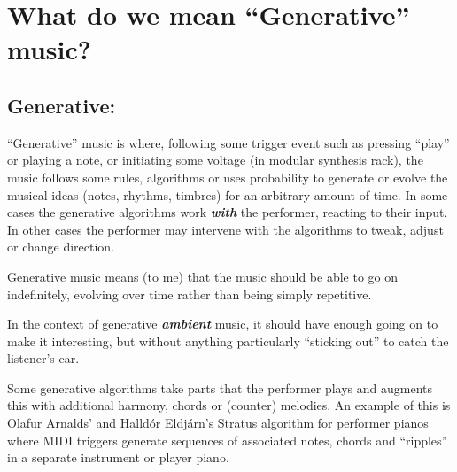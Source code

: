 \documentclass[
  12pt,
  letterpaper,
  oneside,
  open=any]{scrbook}
\begin{document}

\chapter{What do we mean ``Generative''
music?}\label{0000-Defintion-Generative}

\section*{Generative:}\label{generative}


``Generative'' music is where, following some trigger event such as
pressing ``play'' or playing a note, or initiating some voltage (in
modular synthesis rack), the music follows some rules, algorithms or
uses probability to generate or evolve the musical ideas (notes,
rhythms, timbres) for an arbitrary amount of time. In some cases the
generative algorithms work \textbf{\emph{with}} the performer, reacting
to their input. In other cases the performer may intervene with the
algorithms to tweak, adjust or change direction.

\begin{tcolorbox}[enhanced jigsaw, opacitybacktitle=0.6, rightrule=.15mm, leftrule=.75mm, opacityback=0, toptitle=1mm, toprule=.15mm, breakable, titlerule=0mm, colback=white, bottomtitle=1mm, title=\textcolor{quarto-callout-tip-color}{\faLightbulb}\hspace{0.5em}{Key idea}, coltitle=black, left=2mm, colframe=quarto-callout-tip-color-frame, bottomrule=.15mm, colbacktitle=quarto-callout-tip-color!10!white, arc=.35mm]

Generative music means (to me) that the music should be able to go on
indefinitely, evolving over time rather than being simply repetitive.

In the context of generative \textbf{\emph{ambient}} music, it should
have enough going on to make it interesting, but without anything
particularly ``sticking out'' to catch the listener's ear.

\end{tcolorbox}

Some generative algorithms take parts that the performer plays and
augments this with additional harmony, chords or (counter) melodies. An
example of this is
\href{https://www.youtube.com/watch?v=ktxkEBT5CB0}{Olafur Arnalds' and
Halldór Eldjárn's Stratus algorithm for performer pianos} where MIDI
triggers generate sequences of associated notes, chords and ``ripples''
in a separate instrument or player piano.
\end{document}
